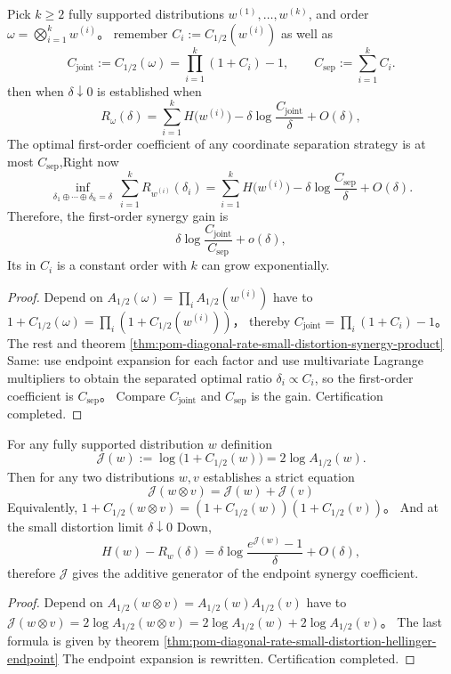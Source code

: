 \begin{theorem}\label{thm:pom-diagonal-rate-small-distortion-synergy-k}
Pick \(k\ge 2\) fully supported distributions \(w^{(1)},\dots,w^{(k)}\), and order \(\omega=\bigotimes_{i=1}^k w^{(i)}\)。
remember \(C_i:=C_{1/2}(w^{(i)})\) as well as
\[
C_{\mathrm{joint}}:=C_{1/2}(\omega)=\prod_{i=1}^k(1+C_i)-1,\qquad
C_{\mathrm{sep}}:=\sum_{i=1}^k C_i.
\]
then when \(\delta\downarrow 0\) is established when
\[
R_{\omega}(\delta)=\sum_{i=1}^k H\!\bigl(w^{(i)}\bigr)-\delta\log\frac{C_{\mathrm{joint}}}{\delta}+O(\delta),
\]
The optimal first-order coefficient of any coordinate separation strategy is at most \(C_{\mathrm{sep}}\),Right now
\[
\inf_{\delta_1\oplus\cdots\oplus\delta_k=\delta}\ \sum_{i=1}^k R_{w^{(i)}}(\delta_i)
=\sum_{i=1}^k H\!\bigl(w^{(i)}\bigr)-\delta\log\frac{C_{\mathrm{sep}}}{\delta}+O(\delta).
\]
Therefore, the first-order synergy gain is
\[
\delta\log\frac{C_{\mathrm{joint}}}{C_{\mathrm{sep}}}+o(\delta),
\]
Its in \(C_i\) is a constant order with \(k\) can grow exponentially.
\end{theorem}
\begin{proof}
Depend on \(A_{1/2}(\omega)=\prod_i A_{1/2}(w^{(i)})\) have to
\(
1+C_{1/2}(\omega)=\prod_i (1+C_{1/2}(w^{(i)}))
\)，
thereby \(C_{\mathrm{joint}}=\prod_i(1+C_i)-1\)。
The rest and theorem \ref{thm:pom-diagonal-rate-small-distortion-synergy-product} Same: use endpoint expansion for each factor and use multivariate Lagrange multipliers to obtain the separated optimal ratio \(\delta_i\propto C_i\), so the first-order coefficient is \(C_{\mathrm{sep}}\)。
Compare \(C_{\mathrm{joint}}\) and \(C_{\mathrm{sep}}\) is the gain. Certification completed.
\end{proof}

\begin{corollary}\label{cor:pom-diagonal-rate-small-distortion-synergy-generator-homomorphism}
For any fully supported distribution \(w\) definition
\[
\mathcal J(w):=\log\bigl(1+C_{1/2}(w)\bigr)=2\log A_{1/2}(w).
\]
Then for any two distributions \(w,v\) establishes a strict equation
\[
\boxed{\;
\mathcal J(w\otimes v)=\mathcal J(w)+\mathcal J(v)\;}
\]
Equivalently,
\(
1+C_{1/2}(w\otimes v)=(1+C_{1/2}(w))(1+C_{1/2}(v))
\)。
And at the small distortion limit \(\delta\downarrow 0\) Down,
\[
H(w)-R_w(\delta)=\delta\log\frac{e^{\mathcal J(w)}-1}{\delta}+O(\delta),
\]
therefore \(\mathcal J\) gives the additive generator of the endpoint synergy coefficient.
\end{corollary}
\begin{proof}
Depend on \(A_{1/2}(w\otimes v)=A_{1/2}(w)A_{1/2}(v)\) have to
\(
\mathcal J(w\otimes v)=2\log A_{1/2}(w\otimes v)=2\log A_{1/2}(w)+2\log A_{1/2}(v)
\)。
The last formula is given by theorem \ref{thm:pom-diagonal-rate-small-distortion-hellinger-endpoint} The endpoint expansion is rewritten. Certification completed.
\end{proof}

